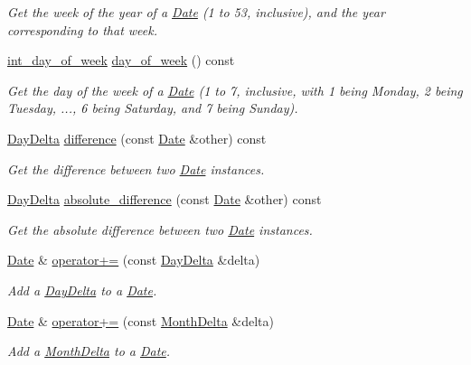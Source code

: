 \begin{DoxyCompactItemize}
\begin{DoxyCompactList}\small\item\em Get the week of the year of a \hyperlink{structDate}{Date} (1 to 53, inclusive), and the year corresponding to that week. \end{DoxyCompactList}\item 
\hyperlink{types_8h_a78b244794c680f1753a6d92eed77aeda}{int\-\_\-day\-\_\-of\-\_\-week} \hyperlink{structDate_ac85eed3a3b2d579cdc74b2af801740b0}{day\-\_\-of\-\_\-week} () const 
\begin{DoxyCompactList}\small\item\em Get the day of the week of a \hyperlink{structDate}{Date} (1 to 7, inclusive, with 1 being Monday, 2 being Tuesday, ..., 6 being Saturday, and 7 being Sunday). \end{DoxyCompactList}\item 
\hyperlink{structDayDelta}{Day\-Delta} \hyperlink{structDate_aaf5d0adf703c6d7d48f1742c320cb2b6}{difference} (const \hyperlink{structDate}{Date} \&other) const 
\begin{DoxyCompactList}\small\item\em Get the difference between two \hyperlink{structDate}{Date} instances. \end{DoxyCompactList}\item 
\hyperlink{structDayDelta}{Day\-Delta} \hyperlink{structDate_a99bd240acacbb056a0ece6cb604fb7e1}{absolute\-\_\-difference} (const \hyperlink{structDate}{Date} \&other) const 
\begin{DoxyCompactList}\small\item\em Get the absolute difference between two \hyperlink{structDate}{Date} instances. \end{DoxyCompactList}\item 
\hyperlink{structDate}{Date} \& \hyperlink{structDate_a0d7e72cd689c957e981f64da5565c5cc}{operator+=} (const \hyperlink{structDayDelta}{Day\-Delta} \&delta)
\begin{DoxyCompactList}\small\item\em Add a \hyperlink{structDayDelta}{Day\-Delta} to a \hyperlink{structDate}{Date}. \end{DoxyCompactList}\item 
\hyperlink{structDate}{Date} \& \hyperlink{structDate_a6a69c92d288794dc5f33647b7fb67d67}{operator+=} (const \hyperlink{structMonthDelta}{Month\-Delta} \&delta)
\begin{DoxyCompactList}\small\item\em Add a \hyperlink{structMonthDelta}{Month\-Delta} to a \hyperlink{structDate}{Date}. \end{DoxyCompactList}\item 

\end{DoxyCompactItemize}
